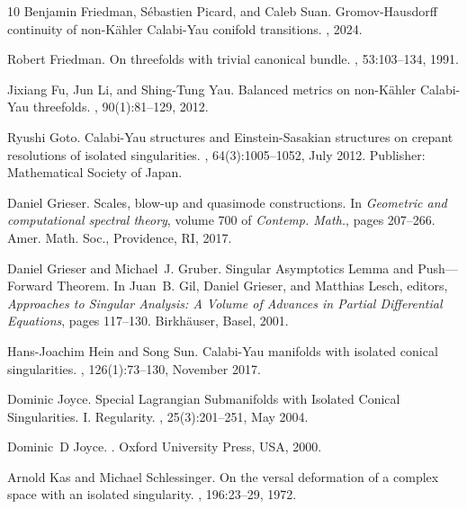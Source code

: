 \documentclass[a4paper,11pt]{article}
\begin{document}
\begin{thebibliography}{10}
Benjamin Friedman, S{\'e}bastien Picard, and Caleb Suan.
\newblock Gromov-{Hausdorff} continuity of non-{K{ä}hler} {Calabi}-{Yau} conifold transitions.
, 2024.

Robert Friedman.
\newblock On threefolds with trivial canonical bundle.
, 53:103--134, 1991.

Jixiang Fu, Jun Li, and Shing-Tung Yau.
\newblock Balanced metrics on non-{K}{\"a}hler {C}alabi-{Y}au threefolds.
, 90(1):81--129, 2012.

Ryushi Goto.
\newblock Calabi-{Yau} structures and {Einstein}-{Sasakian} structures on crepant resolutions of isolated singularities.
, 64(3):1005--1052, July 2012.
\newblock Publisher: Mathematical Society of Japan.

Daniel Grieser.
\newblock Scales, blow-up and quasimode constructions.
\newblock In {\em Geometric and computational spectral theory}, volume 700 of {\em Contemp. Math.}, pages 207--266. Amer. Math. Soc., Providence, RI, 2017.

Daniel Grieser and Michael~J. Gruber.
\newblock Singular {Asymptotics} {Lemma} and {Push}—{Forward} {Theorem}.
\newblock In Juan~B. Gil, Daniel Grieser, and Matthias Lesch, editors, {\em Approaches to {Singular} {Analysis}: {A} {Volume} of {Advances} in {Partial} {Differential} {Equations}}, pages 117--130. Birkhäuser, Basel, 2001.

Hans-Joachim Hein and Song Sun.
\newblock Calabi-{Yau} manifolds with isolated conical singularities.
, 126(1):73--130, November 2017.

Dominic Joyce.
\newblock Special {Lagrangian} {Submanifolds} with {Isolated} {Conical} {Singularities}. {I}. {Regularity}.
, 25(3):201--251, May 2004.

Dominic~D Joyce.
.
\newblock Oxford University Press, USA, 2000.

Arnold Kas and Michael Schlessinger.
\newblock On the versal deformation of a complex space with an isolated singularity.
, 196:23--29, 1972.


\end{thebibliography}
\end{document}
